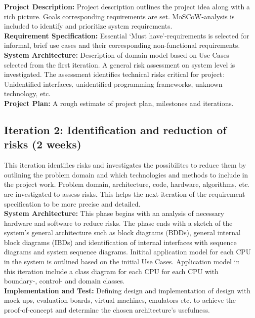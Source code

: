 \textbf{Project Description:} Project description outlines the project idea along with a rich picture. Goals corresponding requirements are set. MoSCoW-analysis is included to identify and prioritize system requirements. \\
\textbf{Requirement Specification:} Essential `Must have'-requirements is selected for informal, brief use cases and their corresponding non-functional requirements. \\
\textbf{System Architecture:} Description of domain model based on Use Cases selected from the first iteration. A general risk assessment on system level is investigated. The assessment identifies technical risks critical for project: Unidentified interfaces, unidentified programming frameworks, unknown technology, etc. \\
\textbf{Project Plan:} A rough estimate of project plan, milestones and iterations.

\subsection{Iteration 2: Identification and reduction of risks (2 weeks)}
This iteration identifies risks and investigates the possibilites to reduce them by outlining the problem domain and which technologies and methods to include in the project work.
Problem domain, architecture, code, hardware, algorithms, etc. are investigated to assess risks. This helps the next iteration  of the requirement specification to be more precise and detailed. \\

\textbf{System Architecture:} This phase begins with an analysis of necessary hardware and software to reduce risks. The phase ends with a sketch of the system's general architecture such as block diagrams (BDDs), general internal block diagrams (IBDs) and identification of internal interfaces with sequence diagrams and system sequence diagrams. Initital application model for each CPU in the system is outlined based on the initial Use Cases. Application model in this iteration include a class diagram for each CPU for each CPU with boundary-, control- and domain classes. \\

\textbf{Implementation and Test:} Defining design and implementation of design with mock-ups, evaluation boards, virtual machines, emulators etc. to achieve the proof-of-concept and determine the chosen architecture's usefulness. \\


